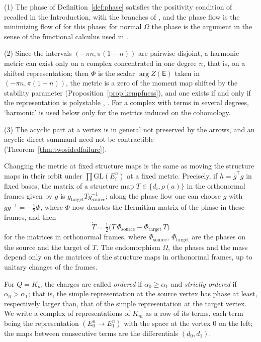 \begin{remark}\label{rem:phase}
(1) The phase of Definition~\ref{def:phase} satisfies the positivity
condition of \cite[\S4.2]{hkkp26} recalled in the Introduction, with the
branches of \cite[(5.15)]{hkkp26}, and the phase flow is the minimizing flow
of \cite[\S4.1]{hkkp26} for this phase; for normal $\Omega$ the phase is the
argument in the sense of the functional calculus used in
\cite[\S5.4]{hkkp26}.

(2) Since the intervals $(-\pi n,\pi(1-n))$ are pairwise disjoint, a harmonic
metric can exist only on a complex concentrated in one degree $n$, that is,
on a shifted representation; then $\Phi$ is the scalar $\arg Z(\mathsf E)$
taken in $(-\pi n,\pi(1-n))$, the metric is a zero of the moment map shifted
by the stability parameter (Proposition~\ref{prop:kempfness}), and one
exists if and only if the representation is polystable
\cite[Theorem~5.1]{hkkp26}, \cite[Proposition~6.5]{kin94}. For a complex with
terms in several degrees, `harmonic' is used below only for the metrics
induced on the cohomology.

(3) The acyclic part at a vertex is in general not preserved by the arrows,
and an acyclic direct summand need not be contractible
(Theorem~\ref{thm:twosidedfailure}).
\end{remark}

Changing the metric at fixed structure maps is the same as moving the
structure maps in their orbit under $\prod\mathrm{GL}(E_i^n)$ at a fixed
metric. Precisely, if $h=\overline g^{\mathsf T}g$ in fixed bases, the matrix
of a structure map
$T\in\{d_i,\rho(a)\}$ in the orthonormal frames given by $g$ is
$g_{\mathrm{target}}Tg_{\mathrm{source}}^{-1}$; along the phase flow one can
choose $g$ with $\dot gg^{-1}=-\frac12\Phi$, where $\Phi$ now denotes the
Hermitian matrix of the phase in these frames, and then
\begin{equation}\label{eq:frameflow}
 \dot T=\tfrac12\bigl(T\,\Phi_{\mathrm{source}}-\Phi_{\mathrm{target}}\,T\bigr)
\end{equation}
for the matrices in orthonormal frames, where $\Phi_{\mathrm{source}}$,
$\Phi_{\mathrm{target}}$ are the phases on the source and the target of $T$.
The endomorphism $\Omega$, the phases and the mass depend only on the
matrices of the structure maps in orthonormal frames, up to unitary changes
of the frames.

For $Q=K_m$ the charges are called \emph{ordered} if
$\alpha_0\geq\alpha_1$ and \emph{strictly ordered} if $\alpha_0>\alpha_1$;
that is, the simple representation at the source vertex has phase at least,
respectively larger than, that of the simple representation at the target
vertex. We
write a complex of representations of $K_m$ as a row of its terms, each term
being the representation $(E_0^n\to E_1^n)$ with the space at the vertex $0$
on the left; the maps between consecutive terms are the differentials
$(d_0,d_1)$.

